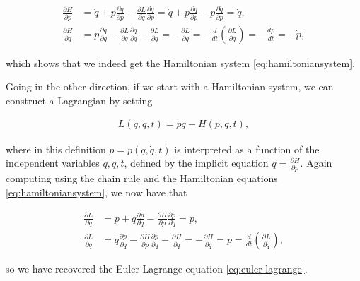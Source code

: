 \documentclass[11pt]{report}
\theoremstyle{plain}
\theoremstyle{definition}
\begin{document}
\begin{align*}
\frac{\partial H}{\partial p} &= \dot{q} + p \frac{\partial \dot{q}}{\partial p} - \frac{\partial L}{\partial \dot{q}} \frac{\partial \dot{q}}{\partial p} =
\dot{q} + p \frac{\partial \dot{q}}{\partial p} - p \frac{\partial \dot{q}}{\partial p} = \dot{q}, \\
\frac{\partial H}{\partial q} &= p \frac{\partial \dot{q}}{\partial q} - \frac{\partial L}{\partial \dot{q}}\frac{\partial \dot{q}}{\partial q}-\frac{\partial L}{\partial q} = -\frac{\partial L}{\partial q} =
- \frac{d}{dt} \left( \frac{\partial L}{\partial \dot{q}}\right) = -\frac{dp}{dt} = -\dot{p},
\end{align*}

\noindent which shows that we indeed get the Hamiltonian system
\eqref{eq:hamiltoniansystem}.

Going in the other direction, if we start with a
Hamiltonian system, we can construct a Lagrangian by
setting

\begin{equation*} \tag{6}\label{eq:lagrange-hamilton}
\begin{split}
L(\dot{q}, q, t) = p\dot{q} - H(p,q,t),
\end{split}
\end{equation*}

\noindent where in this definition $p=p(q,\dot{q},t)$ is
interpreted as a function of the independent variables
$q, \dot{q}, t$, defined by the implicit equation
$\dot{q} = \frac{\partial H}{\partial p}$. Again
computing using the chain rule and the Hamiltonian
equations \eqref{eq:hamiltoniansystem}, we now have that

\begin{align*}
\frac{\partial L}{\partial \dot{q}} &= p + \dot{q} \frac{\partial p}{\partial \dot{q}} - \frac{\partial H}{\partial p} \frac{\partial p}{\partial \dot{q}} = p, \\
\frac{\partial L}{\partial q} &= \dot{q}\frac{\partial p}{\partial q}-\frac{\partial H}{\partial p}\frac{\partial p}{\partial q}-\frac{\partial H}{\partial q}=-\frac{\partial H}{\partial q}=\dot{p} = \frac{d}{dt}
\left( \frac{\partial L}{\partial \dot{q}} \right),
\end{align*}

\noindent so we have recovered the Euler-Lagrange equation
\eqref{eq:euler-lagrange}.
\end{document}
